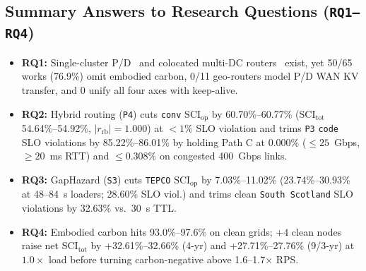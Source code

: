 \subsection{Summary Answers to Research Questions (\texorpdfstring{\texttt{RQ1--RQ4}}{RQ1-RQ4})}\label{subsec:rq_answers}
\begin{itemize}
    \item \textbf{RQ1:} Single-cluster P/D~\cite{shi2024greenllm} and colocated multi-DC routers~\cite{topcu2026tension,moore2025slit,zhang2026context,bernhard2026cleanest,he2025freesh,more2026cedar,cheng2026greenllm} exist, yet 50/65 works (76.9\%) omit embodied carbon, 0/11 geo-routers model P/D WAN KV transfer, and 0 unify all four axes with keep-alive.
    \item \textbf{RQ2:} Hybrid routing (\texttt{P4}) cuts \texttt{conv} $\text{SCI}_{\text{op}}$ by 60.70\%--60.77\% ($\text{SCI}_{\text{tot}}$ 54.64\%--54.92\%, $|r_{\text{rb}}|=1.000$) at $<1\%$ SLO violation and trims \texttt{P3} \texttt{code} SLO violations by 85.22\%--86.01\% by holding Path C at 0.000\% ($\le 25$~Gbps, $\ge 20$~ms RTT) and $\le 0.308\%$ on congested 400~Gbps links.
    \item \textbf{RQ3:} GapHazard (\texttt{S3}) cuts \texttt{TEPCO} $\text{SCI}_{\text{op}}$ by 7.03\%--11.02\% (23.74\%--30.93\% at 48--84~s loaders; 28.60\% SLO viol.) and trims clean \texttt{South Scotland} SLO violations by 32.63\% vs.\ 30~s TTL.
    \item \textbf{RQ4:} Embodied carbon hits 93.0\%--97.6\% on clean grids; $+4$ clean nodes raise net $\text{SCI}_{\text{tot}}$ by +32.61\%--32.66\% (4-yr) and +27.71\%--27.76\% (9/3-yr) at $1.0\times$ load before turning carbon-negative above 1.6--1.7$\times$ RPS.
\end{itemize}
